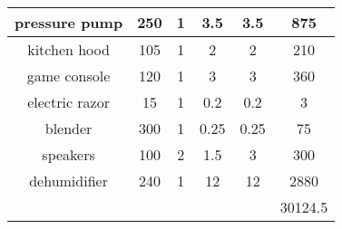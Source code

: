 \begin{table}
\begin{tabular}{|c|c|c|c|c|c|}
    pressure pump & 250   & 1     & 3.5   & 3.5   & 875 \\
    \midrule
    kitchen hood & 105   & 1     & 2     & 2     & 210 \\
    \midrule
    game console & 120   & 1     & 3     & 3     & 360 \\
    \midrule
    electric razor & 15    & 1     & 0.2   & 0.2   & 3 \\
    \midrule
    blender & 300   & 1     & 0.25  & 0.25  & 75 \\
    \midrule
    speakers & 100   & 2     & 1.5   & 3     & 300 \\
    \midrule
    dehumidifier & 240   & 1     & 12    & 12    & 2880 \\
    \midrule
          &       &       &       &       & 30124.5 \\
    \bottomrule
    \end{tabular}%
  \label{tab:addlabel}%
\end{table}%
